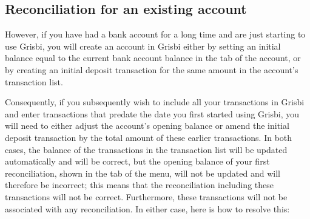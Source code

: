 \subsection{Reconciliation for an existing account\label{reconciliation-solve-old}}

However, if you have had a bank account for a long time and are just starting to use Grisbi, you will create an account in Grisbi either by setting an initial balance equal to the current bank account balance in the  tab of the account, or by creating an initial deposit transaction for the same amount in the account’s transaction list.

Consequently, if you subsequently wish to include all your transactions in Grisbi and enter transactions that predate the date you first started using Grisbi, you will need to either adjust the account’s opening balance or amend the initial deposit transaction by the total amount of these earlier transactions. In both cases, the balance of the transactions in the transaction list will be updated automatically and will be correct, but the opening balance of your first reconciliation, shown in the  tab of the  menu, will not be updated and will therefore be incorrect; this means that the reconciliation including these transactions will not be correct. Furthermore, these transactions will not be associated with any reconciliation. In either case, here is how to resolve this:

